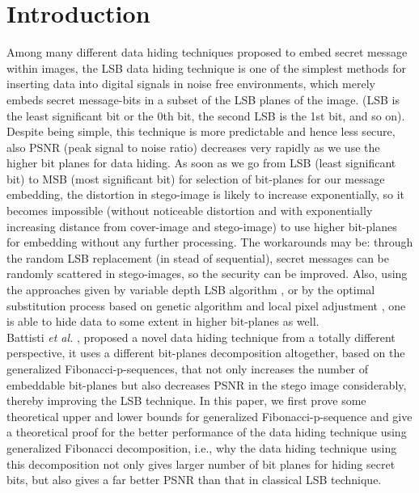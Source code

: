 \documentclass{ijcsa}
\begin{document}
\section{Introduction}
\par 

Among many different data hiding techniques proposed to embed secret message
within images, the LSB data hiding technique is one of the simplest methods
for inserting data into digital signals in noise free environments, which merely
embeds secret message-bits in a subset of the LSB planes of the image. 
(LSB is the least significant bit or the 0th bit, the second LSB is the 1st bit, and so on). 
Despite being simple, this technique is more predictable and hence less secure, 
also PSNR (peak signal to noise ratio) decreases very rapidly as we use the higher bit planes for data hiding. 
As soon as we go from LSB (least significant bit) to MSB (most significant bit) for selection of bit-planes for
our message embedding, the distortion in stego-image is likely to increase
exponentially, so it becomes impossible (without noticeable distortion and
with exponentially increasing distance from cover-image and stego-image)
to use higher bit-planes for embedding without any further processing.
The workarounds may be: through the random LSB replacement (in stead
of sequential), secret messages can be randomly scattered in stego-images, so
the security can be improved. Also, using the approaches given by variable depth LSB algorithm \cite{liu04}, 
or by the optimal substitution process based on genetic algorithm and
local pixel adjustment \cite{wang01}, one is able to hide data to some extent
in higher bit-planes as well.\\

Battisti {\it et al.} \cite{battisti06}, \cite{pic06} proposed a novel data hiding technique from a totally different perspective, it uses a different bit-planes decomposition altogether, based on the generalized Fibonacci-p-sequences, that not only increases the number of embeddable bit-planes but also decreases PSNR in the stego image considerably, thereby improving the LSB technique. In this paper, we first prove some theoretical upper and lower bounds for generalized Fibonacci-p-sequence and give a theoretical proof for the better performance of the data hiding technique using generalized Fibonacci decomposition, i.e., why the data hiding technique using this decomposition not only gives larger number of bit planes for hiding secret bits, but also gives a far better PSNR than that in classical LSB technique. \\
\end{document}
